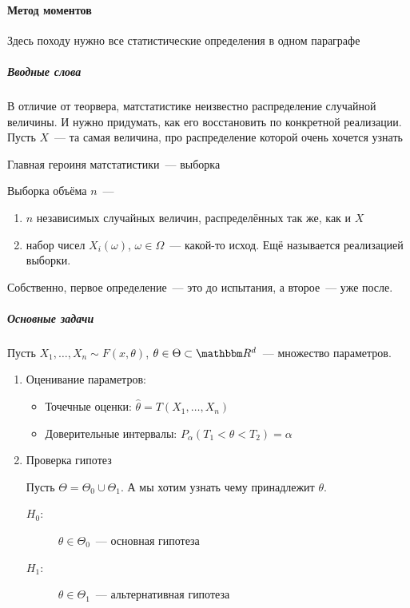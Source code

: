 \documentclass[12pt,ebook]{../../../notes}
\begin{document}
\paragraph{Метод моментов}
\label{par:stat::mom}

Здесь походу нужно все статистические определения в одном параграфе \flame

\subparagraph{Вводные слова}
В отличие от теорвера, матстатистике неизвестно распределение случайной величины. И нужно
придумать, как его восстановить по конкретной реализации. Пусть $X$~--- та самая величина,
про распределение которой очень хочется узнать

Главная героиня матстатистики~--- выборка
\begin{defn}\label{defn:stat::mom::chosen}
  Выборка объёма $n$~--- 
  \begin{enumerate}
    \item $n$ независимых случайных величин, распределённых так же, как и $X$
    \item набор чисел $X_i(\omega)$, $\omega \in \Omega$~--- какой-то исход. Ещё называется
      реализацией выборки.
  \end{enumerate}
  Собственно, первое определение~--- это до испытания, а второе~--- уже после.
\end{defn}

\subparagraph{Основные задачи}
Пусть $X_1, \dotsc, X_n \sim F(x,\theta)$, $\theta \in \Theta \subset \R^d$~--- множество
параметров.

\begin{enumerate}
  \item Оценивание параметров:
    \begin{itemize}
      \item Точечные оценки: $\hat\theta = T(X_1, \dotsc, X_n)$
      \item Доверительные интервалы: $P_\alpha (T_1 < \theta < T_2) = \alpha$
    \end{itemize}
  \item Проверка гипотез\par
    Пусть $\Theta = \Theta_0 \cup \Theta_1$. А мы хотим узнать чему принадлежит $\theta$. 
    \begin{description}
      \item[$H_0$:] $\theta\in \Theta_0$~--- основная гипотеза 
      \item[$H_1$:] $\theta\in \Theta_1$~--- альтернативная гипотеза 
    \end{description}
\end{enumerate}
\end{document}

